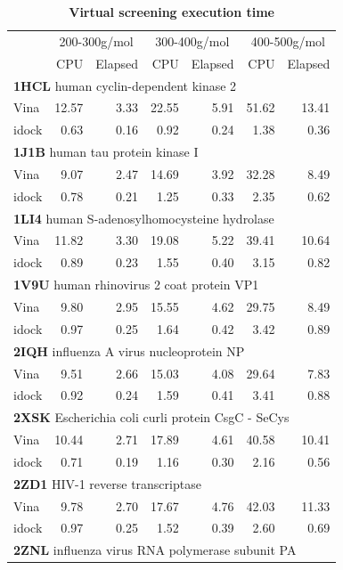 \documentclass[10pt]{article}
\begin{document}
\begin{table}[!ht]
\caption{
\bf{Virtual screening execution time}}
\begin{tabular}{lrrrrrr}
\hline
& \multicolumn{2}{c}{200-300g/mol} & \multicolumn{2}{c}{300-400g/mol} & \multicolumn{2}{c}{400-500g/mol}\\
& CPU & Elapsed & CPU & Elapsed & CPU & Elapsed\\
\hline
\multicolumn{7}{l}{\textbf{1HCL} human cyclin-dependent kinase 2}\\
Vina  & 12.57 &  3.33 & 22.55 &  5.91 & 51.62 & 13.41\\
idock &  0.63 &  0.16 &  0.92 &  0.24 &  1.38 &  0.36\\
\multicolumn{7}{l}{\textbf{1J1B} human tau protein kinase I}\\
Vina  &  9.07 &  2.47 & 14.69 &  3.92 & 32.28 &  8.49\\
idock &  0.78 &  0.21 &  1.25 &  0.33 &  2.35 &  0.62\\
\multicolumn{7}{l}{\textbf{1LI4} human S-adenosylhomocysteine hydrolase}\\
Vina  & 11.82 &  3.30 & 19.08 &  5.22 & 39.41 & 10.64\\
idock &  0.89 &  0.23 &  1.55 &  0.40 &  3.15 &  0.82\\
\multicolumn{7}{l}{\textbf{1V9U} human rhinovirus 2 coat protein VP1}\\
Vina  &  9.80 &  2.95 & 15.55 &  4.62 & 29.75 &  8.49\\
idock &  0.97 &  0.25 &  1.64 &  0.42 &  3.42 &  0.89\\
\multicolumn{7}{l}{\textbf{2IQH} influenza A virus nucleoprotein NP}\\
Vina  &  9.51 &  2.66 & 15.03 &  4.08 & 29.64 &  7.83\\
idock &  0.92 &  0.24 &  1.59 &  0.41 &  3.41 &  0.88\\
\multicolumn{7}{l}{\textbf{2XSK} Escherichia coli curli protein CsgC - SeCys}\\
Vina  & 10.44 &  2.71 & 17.89 &  4.61 & 40.58 & 10.41\\
idock &  0.71 &  0.19 &  1.16 &  0.30 &  2.16 &  0.56\\
\multicolumn{7}{l}{\textbf{2ZD1} HIV-1 reverse transcriptase}\\
Vina  &  9.78 &  2.70 & 17.67 &  4.76 & 42.03 & 11.33\\
idock &  0.97 &  0.25 &  1.52 &  0.39 &  2.60 &  0.69\\
\multicolumn{7}{l}{\textbf{2ZNL} influenza virus RNA polymerase subunit PA}\\

\end{tabular}
\end{table}
\end{document}

